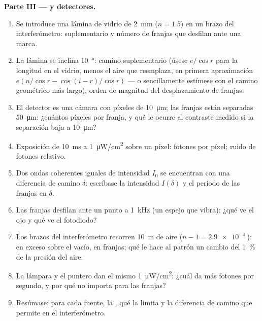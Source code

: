 \begin{problem}
\medskip
\noindent\textbf{Parte III ---  y detectores.}
\begin{enumerate}[resume]
  \item Se introduce una lámina de vidrio de \qty{2}{mm} ($n = 1.5$) en un brazo
        del interferómetro:  suplementario y número de
        franjas que desfilan ante una marca.
  \item La lámina se inclina \qty{10}{\degree}: camino suplementario (úsese $e/\cos r$
        para la longitud en el vidrio, menos el aire que reemplaza, en
        primera aproximación $e(n/\cos r - \cos(i - r)/\cos r)$ --- o sencillamente
        estímese con el camino geométrico más largo); orden de magnitud
        del desplazamiento de franjas.
  \item El detector es una cámara con píxeles de \qty{10}{\micro m}; las franjas
        están separadas \qty{50}{\micro m}: ¿cuántos píxeles por franja, y qué
        le ocurre al contraste medido si la separación baja a
        \qty{10}{\micro m}?
  \item Exposición de \qty{10}{ms} a \qty{1}{\micro W/cm^2} sobre un píxel: fotones por
        píxel; ruido de fotones relativo.
  \item Dos ondas coherentes iguales de intensidad $I_0$ se encuentran con una diferencia
        de camino $\delta$: escríbase la intensidad $I(\delta)$ y el periodo
        de las franjas en $\delta$.
  \item Las franjas desfilan ante un punto a \qty{1}{kHz} (un espejo que
        vibra): ¿qué ve el ojo y qué ve el fotodiodo?
  \item Los brazos del interferómetro recorren \qty{10}{m} de aire ($n - 1 =
        \qty{2.9e-4}{}$):  en exceso sobre el vacío, en franjas;
        qué le hace al patrón un cambio del \qty{1}{\%} de la presión del aire.
  \item La lámpara y el puntero dan el mismo \qty{1}{\micro W/cm^2}: ¿cuál
        da más fotones por segundo, y por qué no importa para
        las franjas?
  \item Resúmase: para cada fuente, la , qué la limita
        y la diferencia de camino que permite en el interferómetro.
\end{enumerate}
\end{problem}

